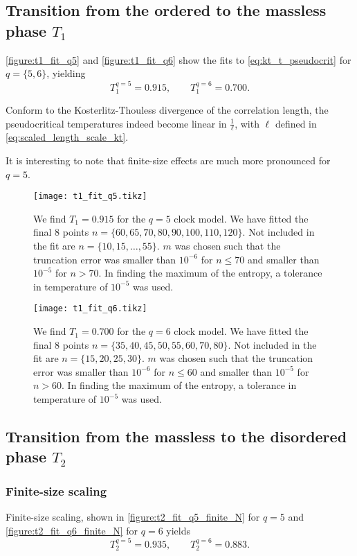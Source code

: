 \subsection{Transition from the ordered to the massless phase $T_1$}

\autoref{figure:t1_fit_q5} and \autoref{figure:t1_fit_q6} show the fits to \autoref{eq:kt_t_pseudocrit} for $q = \{ 5,
6\}$, yielding
\begin{equation}
  T_1^{q = 5} = 0.915, \qquad T_1^{q = 6} = 0.700.
\end{equation}

Conform to the Kosterlitz-Thouless divergence of the correlation length,
the pseudocritical temperatures indeed become linear in $\frac{1}{\ell}$,
with $\ell$ defined in \autoref{eq:scaled_length_scale_kt}.

It is interesting to note that finite-size effects are much more pronounced for $q = 5$.

\begin{figure}
  \centering
  \texttt{[image: t1\_fit\_q5.tikz]}
  \caption{We find $T_1 = 0.915$ for the $q = 5$ clock model.
  We have fitted the final 8 points $n = \{ 60, 65, 70, 80, 90,
  100, 110, 120 \}$. Not included in the fit are $n = \{ 10, 15, \dots, 55 \}$.
  $m$ was chosen such that the truncation error was smaller than $10^{-6}$ for $n \leq 70$ and smaller than $10^{-5}$
  for $n > 70$.
  In finding the maximum of the entropy, a tolerance in temperature of $10^{-5}$ was used.
  }\label{figure:t1_fit_q5}
\end{figure}

\begin{figure}
  \centering
  \texttt{[image: t1\_fit\_q6.tikz]}
  \caption{We find $T_1 = 0.700$ for the $q = 6$ clock model.
  We have fitted the final 8 points $n = \{ 35, 40, 45, 50, 55,
  60, 70, 80 \}$.
  Not included in the fit are $n = \{ 15, 20, 25, 30 \}$.
  $m$ was chosen such that the truncation error was smaller than $10^{-6}$ for $n \leq 60$ and smaller than $10^{-5}$
  for $n > 60$.
  In finding the maximum of the entropy, a tolerance in temperature of $10^{-5}$ was used.
  }\label{figure:t1_fit_q6}
\end{figure}

\subsection{Transition from the massless to the disordered phase $T_2$}

\subsubsection{Finite-size scaling}
Finite-size scaling, shown in \autoref{figure:t2_fit_q5_finite_N} for $q = 5$ and \autoref{figure:t2_fit_q6_finite_N}
for $q = 6$ yields
\begin{equation}
  T_2^{q = 5} = 0.935, \qquad T_2^{q = 6} = 0.883.
\end{equation}


